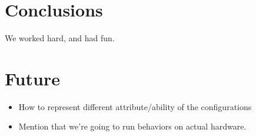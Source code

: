 \documentclass[conference]{IEEEtran}
\theoremstyle{definition}
\begin{document}
\section{Conclusions}
We worked hard, and had fun.

\section{Future}
\begin{itemize}
\item How to represent different attribute/ability of the configurations
\item Mention that we're going to run behaviors on actual hardware.
\end{itemize}







\end{document}
